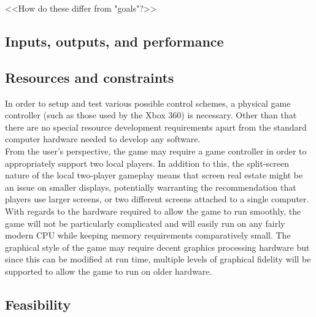 \documentclass[a4paper,10pt]{article}
\begin{document}
<<How do these differ from "goals"?>>

\subsection{Inputs, outputs, and performance}

\subsection{Resources and constraints}
In order to setup and test various possible control schemes, a physical game controller (such as those used by the Xbox 360) is necessary. Other than that there are no special resource development requirements apart from the standard computer hardware needed to develop any software. \\
From the user's perspective, the game may require a game controller in order to appropriately support two local players. In addition to this, the split-screen nature of the local two-player gameplay means that screen real estate might be an issue on smaller displays, potentially warranting the recommendation that players use larger screens, or two different screens attached to a single computer. \\
With regards to the hardware required to allow the game to run smoothly, the game will not be particularly complicated and will easily run on any fairly modern CPU while keeping memory requirements comparatively small. The graphical style of the game may require decent graphics processing hardware but since this can be modified at run time, multiple levels of graphical fidelity will be supported to allow the game to run on older hardware.

\subsection{Feasibility}
\end{document}
